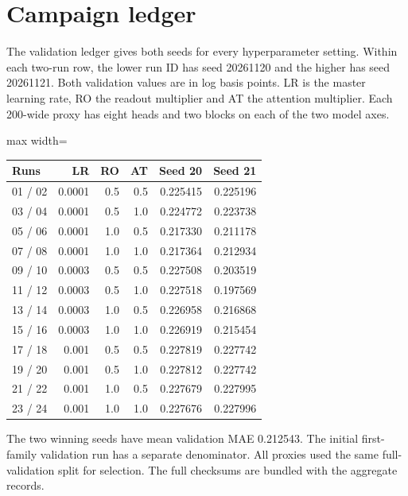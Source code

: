 \documentclass[11pt,oneside,openany]{book}
\begin{document}
\chapter{Campaign ledger}
The validation ledger gives both seeds for every hyperparameter setting. Within each two-run row, the lower run ID has seed 20261120 and the higher has seed 20261121. Both validation values are in log basis points. LR is the master learning rate, RO the readout multiplier and AT the attention multiplier. Each 200-wide proxy has eight heads and two blocks on each of the two model axes.

\begin{center}\footnotesize\sffamily\setlength{\tabcolsep}{3.5pt}\renewcommand{\arraystretch}{1.2}
\begin{adjustbox}{max width=\linewidth}\begin{tabular}{@{}lrrrrr@{}}\toprule
Runs & LR & RO & AT & Seed 20 & Seed 21 \\ \midrule
01 / 02 & 0.0001 & 0.5 & 0.5 & 0.225415 & 0.225196 \\
03 / 04 & 0.0001 & 0.5 & 1.0 & 0.224772 & 0.223738 \\
05 / 06 & 0.0001 & 1.0 & 0.5 & 0.217330 & 0.211178 \\
07 / 08 & 0.0001 & 1.0 & 1.0 & 0.217364 & 0.212934 \\
09 / 10 & 0.0003 & 0.5 & 0.5 & 0.227508 & 0.203519 \\
11 / 12 & 0.0003 & 0.5 & 1.0 & 0.227518 & 0.197569 \\
13 / 14 & 0.0003 & 1.0 & 0.5 & 0.226958 & 0.216868 \\
15 / 16 & 0.0003 & 1.0 & 1.0 & 0.226919 & 0.215454 \\
17 / 18 & 0.001 & 0.5 & 0.5 & 0.227819 & 0.227742 \\
19 / 20 & 0.001 & 0.5 & 1.0 & 0.227812 & 0.227742 \\
21 / 22 & 0.001 & 1.0 & 0.5 & 0.227679 & 0.227995 \\
23 / 24 & 0.001 & 1.0 & 1.0 & 0.227676 & 0.227996 \\
\bottomrule\end{tabular}\end{adjustbox}\end{center}
The two winning seeds have mean validation MAE 0.212543. The initial first-family validation run has a separate denominator. All proxies used the same full-validation split for selection. The full checksums are bundled with the aggregate records.
\end{document}
